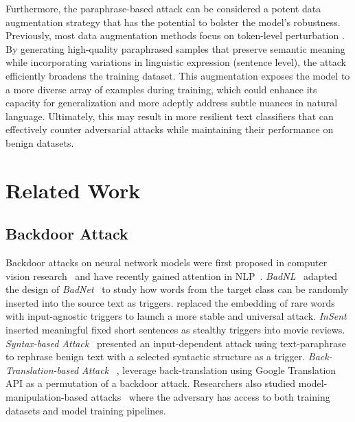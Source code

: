 Furthermore, the paraphrase-based attack can be considered a potent data augmentation strategy that has the potential to bolster the model's robustness. Previously, most data augmentation methods focus on token-level perturbation \cite{wu2020clear}. By generating high-quality paraphrased samples that preserve semantic meaning while incorporating variations in linguistic expression (sentence level), the attack efficiently broadens the training dataset. This augmentation exposes the model to a more diverse array of examples during training, which could enhance its capacity for generalization and more adeptly address subtle nuances in natural language. Ultimately, this may result in more resilient text classifiers that can effectively counter adversarial attacks while maintaining their performance on benign datasets.

\section{Related Work}\label{relatedwork}
\subsection{Backdoor Attack}
Backdoor attacks on neural network models were first proposed in computer vision research~\cite{gu2017badnets, chen2017targeted, liu2017trojaning, shafahi2018poison} and have recently gained attention in NLP~\cite{8836465, alzantot-etal-2018-generating, kurita2020weight, chen2021badnl, yang2021careful, qi2021hidden, yang-etal-2021-careful}. \emph{BadNL}~\cite{chen2021badnl} adapted the design of \emph{BadNet}~\cite{gu2017badnets} to study how words from the target class can be randomly inserted into the source text as triggers. \citet{kurita2020weight} replaced the embedding of rare words with input-agnostic triggers to launch a more stable and universal attack. \emph{InSent}~\cite{8836465} inserted meaningful fixed short sentences as stealthy triggers into movie reviews. \emph{Syntax-based Attack}~\cite{qi2021hidden} presented an input-dependent attack using text-paraphrase to rephrase benign text with a selected syntactic structure as a trigger. \emph{Back-Translation-based Attack} ~\cite{chen2022kallima}, leverage back-translation using Google Translation API as a permutation of a backdoor attack. Researchers also studied model-manipulation-based attacks~\cite{yang-etal-2021-rethinking, yang-etal-2021-careful, qi-etal-2021-turn} where the adversary has access to both training datasets and model training pipelines.

